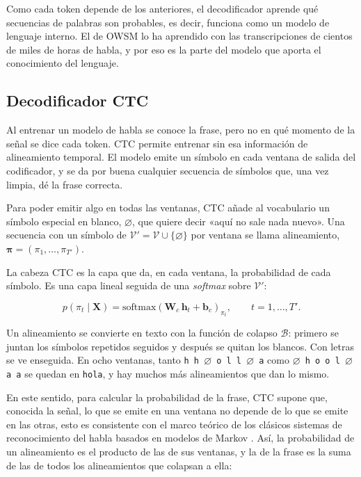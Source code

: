 Como cada token depende de los anteriores, el decodificador aprende qué secuencias de palabras son probables, es decir, funciona como un modelo de lenguaje interno. El de OWSM lo ha aprendido con las transcripciones de cientos de miles de horas de habla, y por eso es la parte del modelo que aporta el conocimiento del lenguaje.

\subsection{Decodificador CTC}
\label{sec:ctc}
\label{sec:decodificacion}

Al entrenar un modelo de habla se conoce la frase, pero no en qué momento de la señal se dice cada token. CTC \cite{graves2006ctc} permite entrenar sin esa información de alineamiento temporal. El modelo emite un símbolo en cada ventana de salida del codificador, y se da por buena cualquier secuencia de símbolos que, una vez limpia, dé la frase correcta.

Para poder emitir algo en todas las ventanas, CTC añade al vocabulario un símbolo especial en blanco, $\varnothing$, que quiere decir «aquí no sale nada nuevo». Una secuencia con un símbolo de $\mathcal{V}' = \mathcal{V} \cup \{\varnothing\}$ por ventana se llama alineamiento, $\boldsymbol{\pi} = (\pi_1, \dots, \pi_{T'})$.

La cabeza CTC es la capa que da, en cada ventana, la probabilidad de cada símbolo. Es una capa lineal seguida de una \textit{softmax} sobre $\mathcal{V}'$:

\begin{equation}
  p(\pi_t \mid \mathbf{X}) = \mathrm{softmax}\left( \mathbf{W}_c\,\mathbf{h}_t + \mathbf{b}_c \right)_{\pi_t}, \qquad t = 1, \dots, T'.
  \label{eq:cabeza-ctc}
\end{equation}

Un alineamiento se convierte en texto con la función de colapso $\mathcal{B}$: primero se juntan los símbolos repetidos seguidos y después se quitan los blancos. Con letras se ve enseguida. En ocho ventanas, tanto \texttt{h h $\varnothing$ o l l $\varnothing$ a} como \texttt{$\varnothing$ h o o l $\varnothing$ a a} se quedan en \texttt{hola}, y hay muchos más alineamientos que dan lo mismo.

En este sentido, para calcular la probabilidad de la frase, CTC supone que, conocida la señal, lo que se emite en una ventana no depende de lo que se emite en las otras, esto es consistente con el marco teórico de los clásicos sistemas de reconocimiento del habla basados en modelos de Markov \cite{rabiner1989hmm}. Así, la probabilidad de un alineamiento es el producto de las de sus ventanas, y la de la frase es la suma de las de todos los alineamientos que colapsan a ella:

